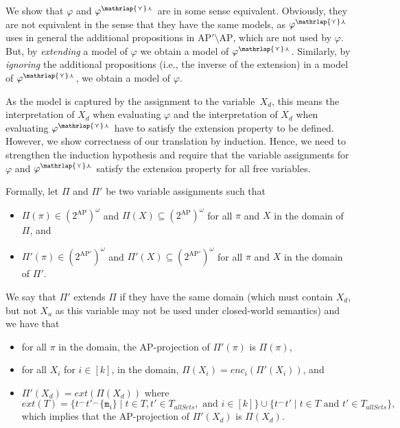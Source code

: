\documentclass[dvipsnames,10pt,a4paper]{amsart}
\theoremstyle{definition}
\theoremstyle{remark}
\renewcommand{\phi}{\varphi}
\newcommand{\pow}[1]{2^{#1}}
\newcommand{\set}[1]{\{#1\}}
\newcommand{\ap}[0]{\mathrm{AP}}
\newcommand{\univar}{X_a}
\newcommand{\unidisvar}{X_d}
\newcommand{\smalar}{{\mathrlap{\curlyvee}\curlywedge}}
\newcommand{\allsets}{{\mathit{allSets}}}
\newcommand{\marker}{\texttt{m}}
\newcommand{\merge}{^\smallfrown}
\newcommand{\enc}{\mathit{enc}}
\newcommand{\extend}{\mathit{ext}}
\begin{document}
We show that $\phi$ and $\phi^{\smalar}$ are in some sense equivalent. 
Obviously, they are not equivalent in the sense that they have the same models, as $\phi^{\smalar}$ uses in general the additional propositions in $\ap' \setminus \ap$, which are not used by $\phi$.
But, by \emph{extending} a model of $\phi$ we obtain a model of $\phi^{\smalar}$.
Similarly, by \emph{ignoring} the additional propositions (i.e., the inverse of the extension) in a model of $\phi^{\smalar}$, we obtain a model of $\phi$.

As the model is captured by the assignment to the variable~$\unidisvar$, this means the interpretation of $\unidisvar$ when evaluating $\phi$ and the  interpretation of $\unidisvar$ when evaluating $\phi^{\smalar}$ have to satisfy the extension property to be defined.
However, we show correctness of our translation by induction.
Hence, we need to strengthen the induction hypothesis and require that the variable assignments for $\varphi$ and $\phi^{\smalar}$ satisfy the extension property for all free variables.

Formally, let $\Pi$ and $\Pi'$ be two variable assignments such that 
\begin{itemize}
    \item $\Pi(\pi) \in (\pow{\ap})^\omega$ and $\Pi(X) \subseteq (\pow{\ap})^\omega$ for all $\pi$ and $X$ in the domain of $\Pi$, and 
    \item $\Pi'(\pi) \in (\pow{\ap'})^\omega$ and $\Pi'(X) \subseteq (\pow{\ap'})^\omega$ for all $\pi$ and $X$ in the domain of $\Pi'$.
\end{itemize}
We say that $\Pi'$ extends $\Pi$ if they have the same domain (which must contain $\unidisvar$, but not $\univar$ as this variable may not be used under closed-world semantics) and we have that
\begin{itemize}
    \item for all $\pi$ in the domain, the $\ap$-projection of $\Pi'(\pi)$ is $\Pi(\pi)$, 
    \item for all $X_i$ for $i \in [k]$, in the domain, $\Pi(X_i) = \enc_i(\Pi'(X_i))$, and
    \item $\Pi'(\unidisvar) = \extend(\Pi(\unidisvar))$ where
    \[\extend(T) = \set{t \merge t'{} \merge \set{\marker_{i}} \mid t \in T, t' \in T_\allsets, \text{ and } i \in [k]} \cup \set{t \merge t' \mid t \in T \text{ and } t' \in T_\allsets},\]
    which implies that the $\ap$-projection of $\Pi'(\unidisvar)$ is $\Pi(\unidisvar)$.
\end{itemize}
\end{document}
